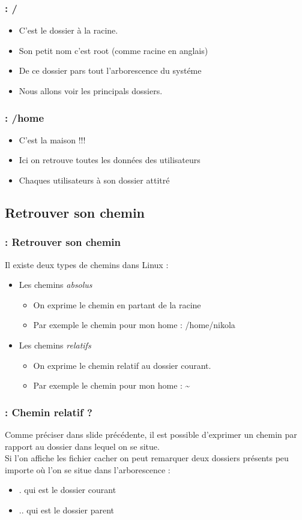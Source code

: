 \documentclass[13pt]{beamer}
\newenvironment{slide}[1]{
  \begin{frame}[environment=slide]
    \frametitle{\textbf{\insertsection}  : #1}}
{\end{frame}}
\begin{document}
\begin{slide}{/}
  \begin{itemize}
  \item C'est le dossier à la racine.
  \item Son petit nom c'est root (comme racine en anglais)
  \item De ce dossier pars tout l'arborescence du systéme
  \item Nous allons voir les principals dossiers.
  \end{itemize}
\end{slide}

\begin{slide}{/home}
  \begin{itemize}
  \item C'est la maison !!!
  \item Ici on retrouve toutes les données des utilisateurs
  \item Chaques utilisateurs à son dossier attitré
  \end{itemize}
\end{slide}

\subsection{Retrouver son chemin}

\begin{slide}{Retrouver son chemin}
  Il existe deux types de chemins dans Linux :
  \begin{itemize}
    \item Les chemins \textit{absolus}
      \begin{itemize}
      \item On exprime le chemin en partant de la racine
      \item Par exemple le chemin pour mon home : /home/nikola
      \end{itemize}
    \item Les chemins \textit{relatifs}
      \begin{itemize}
      \item On exprime le chemin relatif au dossier courant.
      \item Par exemple le chemin pour mon home : \textasciitilde
      \end{itemize}
  \end{itemize}
\end{slide}

\begin{slide}{Chemin relatif ?}
  Comme préciser dans slide précédente, il est possible d'exprimer un chemin par
  rapport au dossier dans lequel on se situe.\\

  Si l'on affiche les fichier cacher on peut remarquer deux dossiers présents
  peu importe où l'on se situe dans l'arborescence :
  \begin{itemize}
  \item . qui est le dossier courant
  \item .. qui est le dossier parent
  \end{itemize}
\end{slide}
\end{document}
